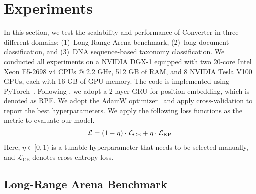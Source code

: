 \section{Experiments}
In this section, we test the scalability and performance of Converter in three different domains: (1)~Long-Range Arena benchmark, (2)~long document classification, and (3)~DNA sequence-based taxonomy classification. We conducted all experiments on a NVIDIA DGX-1 equipped with two 20-core Intel Xeon E5-2698 v4 CPUs @ 2.2 GHz, 512 GB of RAM, and 8 NVIDIA Tesla V100 GPUs, each with 16 GB of GPU memory. The code is implemented using PyTorch~\citep{NEURIPS2019_bdbca288}. Following \citet{neishi-yoshinaga-2019-relation}, we adopt a 2-layer GRU for position embedding, which is denoted as RPE. We adopt the AdamW optimizer~\citep{loshchilov2018decoupled} and apply cross-validation to report the best hyperparameters. We apply the following loss functions as the metric to evaluate our model.
\begin{equation}
\centering
\begin{split}
\mathcal{L} = (1-\eta)\cdot\mathcal{L}_{\text{CE}} + \eta\cdot\mathcal{L}_{\text{KP}}
\end{split}
\end{equation}
Here, $\eta \in {[0, 1)}$ is a tunable hyperparameter that needs to be selected manually, and $\mathcal{L}_{\text{CE}}$ denotes cross-entropy loss.

\subsection{Long-Range Arena Benchmark}

